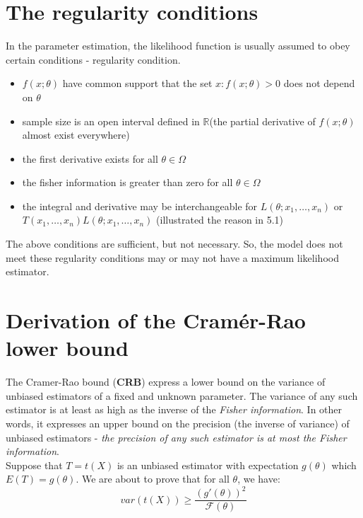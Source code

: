 \documentclass[12pt ]{article}
\begin{document}
\section{The regularity conditions}
In the parameter estimation, the likelihood function is usually assumed to obey certain conditions - regularity condition.
\begin{itemize}
\item $f(x;\theta)$ have common support that the set {$x:f(x;\theta) > 0$} does not depend on $\theta$
\item sample size is an open interval defined in $\mathbb{R}$(the partial derivative of $f(x; \theta)$ almost exist everywhere)
\item the first derivative exists for all $\theta \in \Omega$
\item the fisher information is greater than zero for all $\theta \in \Omega$
\item the integral and derivative may be interchangeable for $L(\theta; x_{1}, \ldots, x_{n})$ or \\
 $T(x_{1}, \ldots, x_{n}) L(\theta;x_{1}, \ldots, x_{n})$ (illustrated the reason in 5.1)
\end{itemize}
The above conditions are sufficient, but not necessary. So, the model does not meet these regularity conditions may or may not have a maximum likelihood estimator.

\section{Derivation of the Cramér-Rao lower bound}
The Cramer-Rao bound (\textbf{CRB}) express a lower bound on the variance of unbiased estimators of a fixed and unknown parameter. The variance of any such estimator is at least as high as the inverse of the \textit{Fisher information}. In other words, it expresses an upper bound on the precision (the inverse of variance) of unbiased estimators - \textit{the precision of any such estimator is at most the Fisher information}.\\

Suppose that $T=t(X)$ is an unbiased estimator with expectation $g(\theta)$ which $E(T) = g(\theta)$. We are about to prove that for all $\theta$, we have:
\begin{equation}
var(t(X)) \geq \frac{(g'(\theta))^2}{\mathcal{F}(\theta)}
\end{equation}
\end{document}
